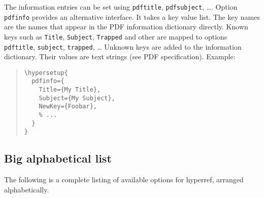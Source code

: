 \documentclass[pdftex]{article}
\begin{document}
The information entries can be set using \texttt{pdftitle},
\texttt{pdfsubject}, \dots. Option \texttt{pdfinfo} provides an alternative
interface. It takes a key value list. The key names are the names that
appear in the PDF information dictionary directly. Known keys such as
\texttt{Title}, \texttt{Subject}, \texttt{Trapped} and other are mapped to
options \texttt{pdftitle}, \texttt{subject}, \texttt{trapped}, \dots
Unknown keys are added to the information dictionary. Their values are text
strings (see PDF specification).
Example:
\begin{quote}
\begin{verbatim}
\hypersetup{
  pdfinfo={
    Title={My Title},
    Subject={My Subject},
    NewKey={Foobar},
    % ...
  }
}
\end{verbatim}
\end{quote}

\subsection{Big alphabetical list}

The following is a complete listing of available options for
\textsf{hyperref}, arranged alphabetically.
\end{document}
